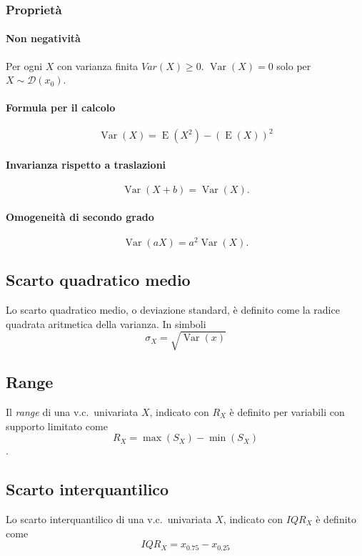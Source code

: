 \documentclass[11pt,a4paper,twoside]{article}
\let\geq\geqslant%
\newcommand\D{\mathcal{D}}
\DeclareMathOperator{\Var}{Var}
\DeclareMathOperator{\E}{E}
\begin{document}
\subsubsection{Proprietà}

\paragraph{Non negatività} Per ogni \(X\) con varianza finita
\(Var(X)\geq 0\).  \(\Var(X) = 0\) solo per \(X\sim \D(x_0)\).

\paragraph{Formula per il calcolo}
\[
  \Var(X) = \E(X^2) - ( \E(X) )^2
\]

\paragraph{Invarianza rispetto a traslazioni}
\[
  \Var(X+b) = \Var(X) .
\]

\paragraph{Omogeneità di secondo grado}
\[
  \Var(aX) = a^2 \Var(X).
\]

\subsection{Scarto quadratico medio}

Lo scarto quadratico medio, o deviazione standard, è definito come la
radice quadrata aritmetica della varianza.  In simboli
\[
  \sigma_X = \sqrt{\Var(x)}
\]

\subsection{Range}

Il \textit{range} di una v.c.\ univariata \(X\), indicato con \(R_X\)
è definito per variabili con supporto limitato come
\[
  R_X = \max(S_X) - \min(S_X)
\].

\subsection{Scarto interquantilico}
Lo scarto interquantilico di una v.c.\ univariata \(X\), indicato con
\(IQR_X\) è definito come
\[
  IQR_X = x_{0.75} - x_{0.25}
\]
\end{document}
